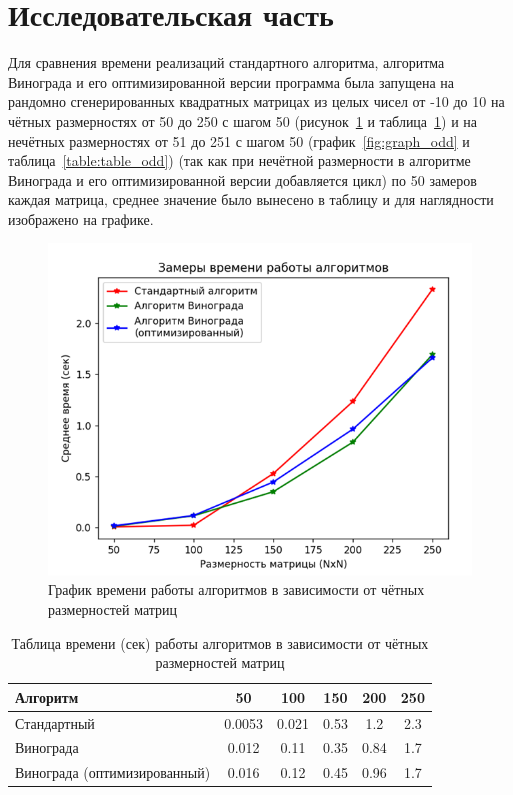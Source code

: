 \section{Исследовательская часть}

\hspace{1.25cm}
Для сравнения времени реализаций стандартного алгоритма, алгоритма Винограда и его оптимизированной версии программа была запущена на рандомно сгенерированных квадратных матрицах из целых чисел от -10 до 10 на чётных размерностях от 50 до 250 с шагом 50 (рисунок~\ref{fig:graph_even} и таблица~\ref{table:table_even}) и на нечётных размерностях от 51 до 251 с шагом 50 (график~\ref{fig:graph_odd} и таблица~\ref{table:table_odd}) (так как при нечётной размерности в алгоритме Винограда и его оптимизированной версии добавляется цикл) по 50 замеров каждая матрица, среднее значение было вынесено в таблицу и для наглядности изображено на графике.

\begin{figure}[H]
    \centering
    \includegraphics[width=1\textwidth]{img/graph_even.png}
    \caption{График времени работы алгоритмов в зависимости от чётных размерностей матриц}
    \label{fig:graph_even} %
\end{figure}

\begin{table}[H]
    \centering
    \begin{tabular}{|l|c|c|c|c|c|}
        \hline
        \textbf{Алгоритм} & \textbf{50} & \textbf{100} & \textbf{150} & \textbf{200} & \textbf{250}\\
        \hline
        Стандартный & 0.0053 & 0.021 & 0.53 & 1.2 & 2.3 \\
        Винограда & 0.012 & 0.11 & 0.35 & 0.84 & 1.7 \\
        Винограда (оптимизированный) & 0.016 & 0.12 & 0.45 & 0.96 & 1.7 \\
        \hline
    \end{tabular}
    \caption{Таблица времени (сек) работы алгоритмов в зависимости от чётных размерностей матриц}
    \label{table:table_even}
\end{table}

